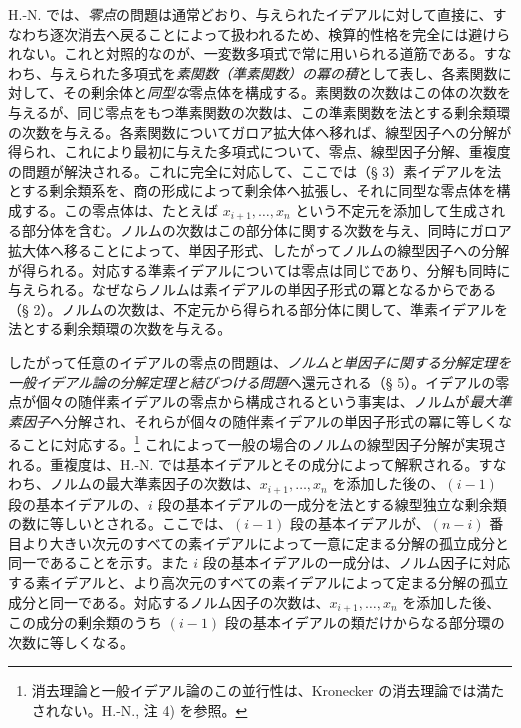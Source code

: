 \documentclass[11pt]{article}
\begin{document}
H.-N. では、\emph{零点}の問題は通常どおり、与えられたイデアルに対して直接に、すなわち逐次消去へ戻ることによって扱われるため、検算的性格を完全には避けられない。これと対照的なのが、一変数多項式で常に用いられる道筋である。すなわち、与えられた多項式を\emph{素関数（準素関数）の冪の積}として表し、各素関数に対して、その剰余体と\emph{同型な}零点体を構成する。素関数の次数はこの体の次数を与えるが、同じ零点をもつ準素関数の次数は、この準素関数を法とする剰余類環の次数を与える。各素関数についてガロア拡大体へ移れば、線型因子への分解が得られ、これにより最初に与えた多項式について、零点、線型因子分解、重複度の問題が解決される。これに完全に対応して、ここでは（§ 3）素イデアルを法とする剰余類系を、商の形成によって剰余体へ拡張し、それに同型な零点体を構成する。この零点体は、たとえば $x_{i+1},\ldots,x_n$ という不定元を添加して生成される部分体を含む。ノルムの次数はこの部分体に関する次数を与え、同時にガロア拡大体へ移ることによって、単因子形式、したがってノルムの線型因子への分解が得られる。対応する準素イデアルについては零点は同じであり、分解も同時に与えられる。なぜならノルムは素イデアルの単因子形式の冪となるからである（§ 2）。ノルムの次数は、不定元から得られる部分体に関して、準素イデアルを法とする剰余類環の次数を与える。

したがって任意のイデアルの零点の問題は、\emph{ノルムと単因子に関する分解定理を一般イデアル論の分解定理と結びつける問題}へ還元される（§ 5）。イデアルの零点が個々の随伴素イデアルの零点から構成されるという事実は、ノルムが\emph{最大準素因子}へ分解され、それらが個々の随伴素イデアルの単因子形式の冪に等しくなることに対応する。\footnote{消去理論と一般イデアル論のこの並行性は、Kronecker の消去理論では満たされない。H.-N., 注 4) を参照。} これによって一般の場合のノルムの線型因子分解が実現される。重複度は、H.-N. では基本イデアルとその成分によって解釈される。すなわち、ノルムの最大準素因子の次数は、$x_{i+1},\ldots,x_n$ を添加した後の、$(i-1)$ 段の基本イデアルの、$i$ 段の基本イデアルの一成分を法とする線型独立な剰余類の数に等しいとされる。ここでは、$(i-1)$ 段の基本イデアルが、$(n-i)$ 番目より大きい次元のすべての素イデアルによって一意に定まる分解の孤立成分と同一であることを示す。また $i$ 段の基本イデアルの一成分は、ノルム因子に対応する素イデアルと、より高次元のすべての素イデアルによって定まる分解の孤立成分と同一である。対応するノルム因子の次数は、$x_{i+1},\ldots,x_n$ を添加した後、この成分の剰余類のうち $(i-1)$ 段の基本イデアルの類だけからなる部分環の次数に等しくなる。
\end{document}
